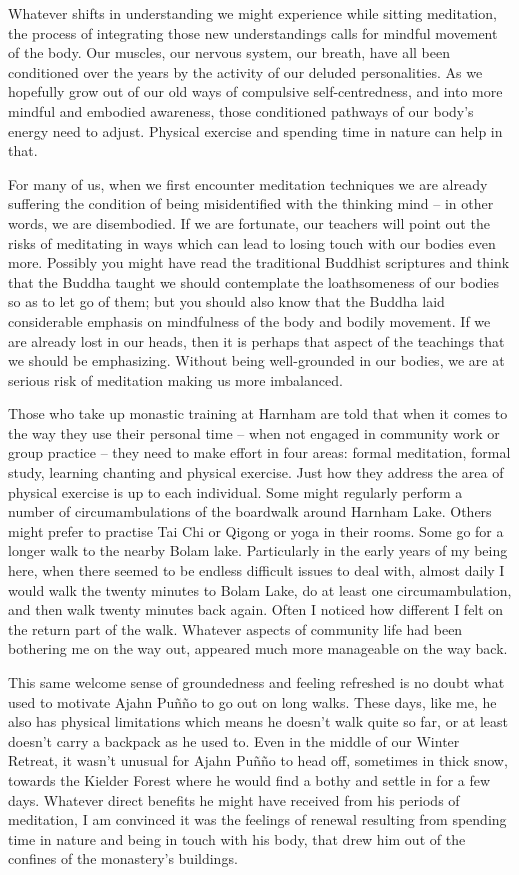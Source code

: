 Whatever shifts in understanding we might experience while sitting
meditation, the process of integrating those new understandings calls
for mindful movement of the body. Our muscles, our nervous system, our
breath, have all been conditioned over the years by the activity of our
deluded personalities. As we hopefully grow out of our old ways of
compulsive self-centredness, and into more mindful and embodied
awareness, those conditioned pathways of our body's energy need to
adjust. Physical exercise and spending time in nature can help in that.

For many of us, when we first encounter meditation techniques we are
already suffering the condition of being misidentified with the thinking
mind -- in other words, we are disembodied. If we are fortunate, our
teachers will point out the risks of meditating in ways which can lead
to losing touch with our bodies even more. Possibly you might have read
the traditional Buddhist scriptures and think that the Buddha taught we
should contemplate the loathsomeness of our bodies so as to let go of
them; but you should also know that the Buddha laid considerable
emphasis on mindfulness of the body and bodily movement. If we are
already lost in our heads, then it is perhaps that aspect of the
teachings that we should be emphasizing. Without being well-grounded in
our bodies, we are at serious risk of meditation making us more
imbalanced.

Those who take up monastic training at Harnham are told that when it
comes to the way they use their personal time -- when not engaged in
community work or group practice -- they need to make effort in four
areas: formal meditation, formal study, learning chanting and physical
exercise. Just how they address the area of physical exercise is up to
each individual. Some might regularly perform a number of
circumambulations of the boardwalk around Harnham Lake. Others might
prefer to practise Tai Chi or Qigong or yoga in their rooms. Some go for
a longer walk to the nearby Bolam lake\cite{lake}.
Particularly in the early years of my being here, when
there seemed to be endless difficult issues to deal with, almost daily I
would walk the twenty minutes to Bolam Lake, do at least one
circumambulation, and then walk twenty minutes back again. Often I
noticed how different I felt on the return part of the walk. Whatever
aspects of community life had been bothering me on the way out, appeared
much more manageable on the way back.

This same welcome sense of groundedness and feeling refreshed is no
doubt what used to motivate Ajahn Puñño to go out on long walks. These
days, like me, he also has physical limitations which means he doesn't
walk quite so far, or at least doesn't carry a backpack as he used to.
Even in the middle of our Winter Retreat, it wasn't unusual for Ajahn
Puñño to head off, sometimes in thick snow, towards the Kielder Forest\cite{kielder}
where he would find a bothy and settle in for a few
days. Whatever direct benefits he might have received from his periods
of meditation, I am convinced it was the feelings of renewal resulting
from spending time in nature and being in touch with his body, that drew
him out of the confines of the monastery's buildings.

